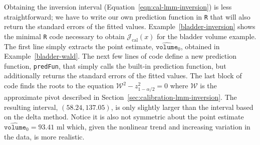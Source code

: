 \documentclass[cmfont,usenames,dvipsnames,leqno]{afit-etd}\usepackage[]{graphicx}\usepackage[]{color}
\newcommand{\code}[1]{\texttt{\small{#1}}}
\newcommand{\mc}[1]{\ensuremath{\mathcal{#1}}}
\newcommand{\wh}[1]{\ensuremath{\widehat{#1}}}
\begin{document}
Obtaining the inversion interval (Equation~\eqref{eqn:cal-lmm-inversion}) is less straightforward; we have to write our own prediction function in \code{R} that will also return the standard errors of the fitted values. Example~\ref{bladder-inversion} shows the minimal \code{R} code necessary to obtain $\mc{J}_\mathrm{cal}(x)$ for the bladder volume example. The first line simply extracts the point estimate, $\wh{\texttt{volume}}_0$, obtained in Example~\ref{bladder-wald}. The next few lines of code define a new prediction function, \code{predFun}, that simply calls the built-in prediction function, but additionally returns the standard errors of the fitted values. The last block of code finds the roots to the equation $\mc{W}^2 - z_{1-\alpha/2}^2 = 0$ where $\mc{W}$ is the approximate pivot described in Section~\ref{sec:calibration-lmm-inversion}. The resulting interval, $(58.24, 137.05)$, is only slightly larger than the interval based on the delta method. Notice it is also not symmetric about the point estimate $\wh{\texttt{volume}}_0 = 93.41 \text{ ml}$ which, given the nonlinear trend and increasing variation in the data, is more realistic. 
\end{document}
